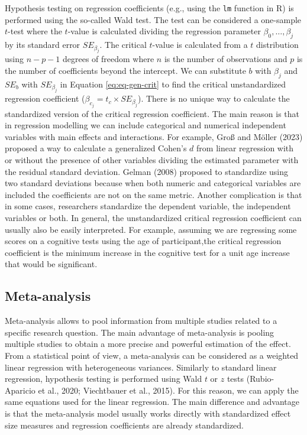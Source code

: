 \documentclass[
  man,floatsintext]{apa7}
\begin{document}
Hypothesis testing on regression coefficients (e.g., using the \texttt{lm} function in R) is performed using the so-called Wald test. The test can be considered a one-sample \(t\)-test where the \(t\)-value is calculated dividing the regression parameter \(\beta_0, \dots, \beta_j\) by its standard error \(SE_{\beta_j}\). The critical \(t\)-value is calculated from a \(t\) distribution using \(n - p - 1\) degrees of freedom where \(n\) is the number of observations and \(p\) is the number of coefficients beyond the intercept. We can substitute \(b\) with \(\beta_j\) and \(SE_{b}\) with \(SE_{\beta_j}\) in Equation \eqref{eq:eq-gen-crit} to find the critical unstandardized regression coefficient (\(\beta_{c_j} = t_c \times SE_{\beta_j}\)). There is no unique way to calculate the standardized version of the critical regression coefficient. The main reason is that in regression modelling we can include categorical and numerical independent variables with main effects and interactions. For example, Groß and Möller (2023) proposed a way to calculate a generalized Cohen's \(d\) from linear regression with or without the presence of other variables dividing the estimated parameter with the residual standard deviation. Gelman (2008) proposed to standardize using two standard deviations because when both numeric and categorical variables are included the coefficients are not on the same metric. Another complication is that in some cases, researchers standardize the dependent variable, the independent variables or both. In general, the unstandardized critical regression coefficient can usually also be easily interpreted. For example, assuming we are regressing some scores on a cognitive tests using the age of participant,the critical regression coefficient is the minimum increase in the cognitive test for a unit age increase that would be significant.

\hypertarget{meta-analysis}{%
\subsection{Meta-analysis}\label{meta-analysis}}

Meta-analysis allows to pool information from multiple studies related to a specific research question. The main advantage of meta-analysis is pooling multiple studies to obtain a more precise and powerful estimation of the effect. From a statistical point of view, a meta-analysis can be considered as a weighted linear regression with heterogeneous variances. Similarly to standard linear regression, hypothesis testing is performed using Wald \(t\) or \(z\) tests (Rubio-Aparicio et al., 2020; Viechtbauer et al., 2015). For this reason, we can apply the same equations used for the linear regression. The main difference and advantage is that the meta-analysis model usually works directly with standardized effect size measures and regression coefficients are already standardized.
\end{document}
